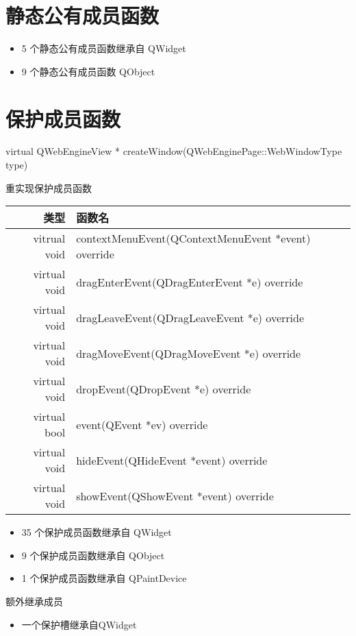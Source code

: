 \section{静态公有成员函数}

\begin{itemize}
	\item 5 个静态公有成员函数继承自 QWidget
	\item 9 个静态公有成员函数 QObject
\end{itemize}

\section{保护成员函数}


virtual QWebEngineView * createWindow(QWebEnginePage::WebWindowType type)

重实现保护成员函数

\begin{tabular}{|r|l|}
	\hline
	类型&  函数名\\
	\hline
vitrual void&	contextMenuEvent(QContextMenuEvent *event) override\\
	\hline
virtual void&	dragEnterEvent(QDragEnterEvent *e) override\\
	\hline
virtual void&	dragLeaveEvent(QDragLeaveEvent *e) override\\
	\hline
virtual void&	dragMoveEvent(QDragMoveEvent *e) override\\
	\hline
virtual void&	dropEvent(QDropEvent *e) override\\
	\hline
virtual bool&	event(QEvent *ev) override\\
	\hline
virtual void&	hideEvent(QHideEvent *event) override\\
	\hline
virtual void&	showEvent(QShowEvent *event) override \\
	\hline
\end{tabular}

\begin{itemize}
\item 35 个保护成员函数继承自 QWidget	
\item 9 个保护成员函数继承自 QObject	
\item 1 个保护成员函数继承自 QPaintDevice
\end{itemize}

额外继承成员

\begin{itemize}
	\item 一个保护槽继承自QWidget
\end{itemize}

